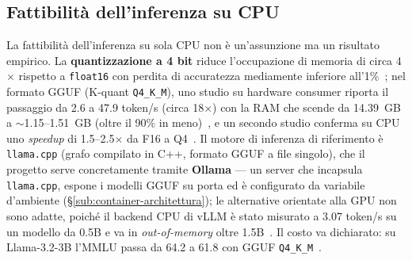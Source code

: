 \begin{table}[htbp]
	\centering
	\caption{Criteri di selezione dello SLM e relative fonti.}
	\label{tab:slm-criteri}
	\small
\end{table}

\subsection{Fattibilità dell'inferenza su CPU}
\label{sub:slm-cpu}

La fattibilità dell'inferenza su sola CPU non è un'assunzione ma un risultato empirico. La \textbf{quantizzazione a 4 bit} riduce l'occupazione di memoria di circa 4$\times$ rispetto a \texttt{float16} con perdita di accuratezza mediamente inferiore all'1\%~\cite{malakhov2026cpullm}; nel formato GGUF (K-quant \texttt{Q4\_K\_M}), uno studio su hardware consumer riporta il passaggio da 2.6 a 47.9 token/s (circa 18$\times$) con la RAM che scende da 14.39~GB a $\sim$1.15--1.51~GB (oltre il 90\% in meno)~\cite{ecommerce2025slm}, e un secondo studio conferma su CPU uno \textit{speedup} di 1.5--2.5$\times$ da F16 a Q4~\cite{cpudominance2025}. Il motore di inferenza di riferimento è \texttt{llama.cpp} (grafo compilato in C++, formato GGUF a file singolo), che il progetto serve concretamente tramite \textbf{Ollama} --- un server che incapsula \texttt{llama.cpp}, espone i modelli GGUF su porta ed è configurato da variabile d'ambiente (§\ref{sub:container-architettura}); le alternative orientate alla GPU non sono adatte, poiché il backend CPU di vLLM è stato misurato a 3.07 token/s su un modello da 0.5B e va in \textit{out-of-memory} oltre 1.5B~\cite{ondevice2025systematic}. Il costo va dichiarato: su Llama-3.2-3B l'MMLU passa da 64.2 a 61.8 con GGUF \texttt{Q4\_K\_M}~\cite{mobilequant2025}.

